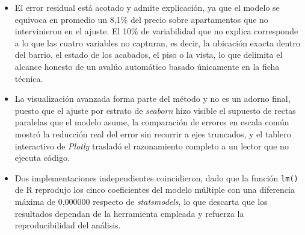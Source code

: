 \begin{itemize}
        \vspace{10pt}

        \item El error residual está acotado y admite explicación, ya que el modelo
        se equivoca en promedio un 8,1\% del precio sobre apartamentos que no
        intervinieron en el ajuste. El 10\% de variabilidad que no explica
        corresponde a lo que las cuatro variables no capturan, es decir, la
        ubicación exacta dentro del barrio, el estado de los acabados, el piso o la
        vista, lo que delimita el alcance honesto de un avalúo automático basado
        únicamente en la ficha técnica.

        \vspace{10pt}

        \item La visualización avanzada forma parte del método y no es un adorno
        final, puesto que el ajuste por estrato de \textit{seaborn} hizo visible el
        supuesto de rectas paralelas que el modelo asume, la comparación de errores
        en escala común mostró la reducción real del error sin recurrir a ejes
        truncados, y el tablero interactivo de \textit{Plotly} trasladó el
        razonamiento completo a un lector que no ejecuta código.

        \vspace{10pt}

        \item Dos implementaciones independientes coincidieron, dado que la función
        \texttt{lm()} de R reprodujo los cinco coeficientes del modelo múltiple con
        una diferencia máxima de 0,000000 respecto de \textit{statsmodels}, lo que
        descarta que los resultados dependan de la herramienta empleada y refuerza
        la reproducibilidad del análisis.
    \end{itemize}
